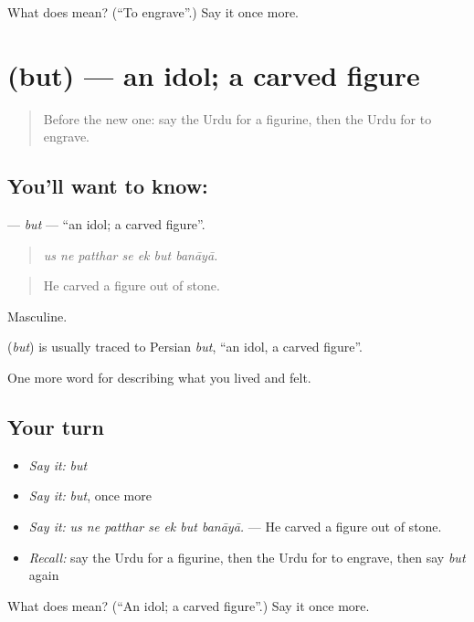 \begin{tcolorbox}[breakable,colback=teal!4,colframe=teal!35!black,title={Before you move on}]
What does   mean? (\textquotedblleft{}To engrave\textquotedblright{}.) Say it once more.
\end{tcolorbox}
\section[\texorpdfstring{\ur{بت} (but)}{بت (but)}]{ (but) — an idol; a carved figure}

\label{lesson:UR-C516-but}



\begin{quote}
Before the new one: say the Urdu for a figurine, then the Urdu for to engrave.
\end{quote}

\subsection*{You'll want to know: }
\textbf{} — \emph{but} — \textquotedblleft{}an idol; a carved figure\textquotedblright{}.

\begin{quote}
      
\end{quote}

\begin{quote}
\emph{us ne patthar se ek but banāyā.}
\end{quote}

\begin{quote}
He carved a figure out of stone.
\end{quote}

Masculine.

\begin{cousinweb}
\textbf{} (\emph{but}) is usually traced to Persian \emph{but}, \textquotedblleft{}an idol, a carved figure\textquotedblright{}.
\end{cousinweb}

\begin{grammarlens}[title={What you've built}]
One more word for describing what you lived and felt.
\end{grammarlens}

\subsection*{Your turn}
\begin{itemize}
\raggedright
  \item \emph{Say it:} \emph{but}
  \item \emph{Say it:} \emph{but}, once more
  \item \emph{Say it:} \emph{us ne patthar se ek but banāyā.} — He carved a figure out of stone.
  \item \emph{Recall:} say the Urdu for a figurine, then the Urdu for to engrave, then say \emph{but} again
\end{itemize}

\begin{tcolorbox}[breakable,colback=teal!4,colframe=teal!35!black,title={Before you move on}]
What does  mean? (\textquotedblleft{}An idol; a carved figure\textquotedblright{}.) Say it once more.
\end{tcolorbox}
